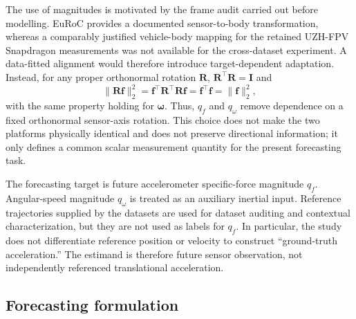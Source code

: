 \documentclass[preprint,12pt]{elsarticle}
\newcommand{\qf}{q_f}
\newcommand{\qw}{q_\omega}
\newcommand{\vect}[1]{\boldsymbol{#1}}
\begin{document}
The use of magnitudes is motivated by the frame audit carried out before modelling. EuRoC provides a documented sensor-to-body transformation, whereas a comparably justified vehicle-body mapping for the retained UZH-FPV Snapdragon measurements was not available for the cross-dataset experiment. A data-fitted alignment would therefore introduce target-dependent adaptation. Instead, for any proper orthonormal rotation $\vect{R}$, $\vect{R}^\top\vect{R}=\vect{I}$ and
\begin{equation}
\|\vect{R}\vect{f}\|_2^2
=\vect{f}^{\top}\vect{R}^{\top}\vect{R}\vect{f}
=\vect{f}^{\top}\vect{f}
=\|\vect{f}\|_2^2,
\label{eq:rotation_invariance}
\end{equation}
with the same property holding for $\vect{\omega}$. Thus, $\qf$ and $\qw$ remove dependence on a fixed orthonormal sensor-axis rotation. This choice does not make the two platforms physically identical and does not preserve directional information; it only defines a common scalar measurement quantity for the present forecasting task.

The forecasting target is future accelerometer specific-force magnitude $\qf$. Angular-speed magnitude $\qw$ is treated as an auxiliary inertial input. Reference trajectories supplied by the datasets are used for dataset auditing and contextual characterization, but they are not used as labels for $\qf$. In particular, the study does not differentiate reference position or velocity to construct ``ground-truth acceleration.'' The estimand is therefore future sensor observation, not independently referenced translational acceleration.

\subsection{Forecasting formulation}
\end{document}
